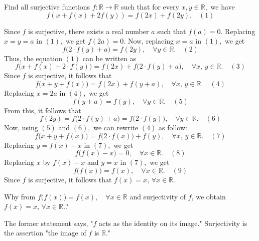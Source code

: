 \begin{solution}
	\begin{tcolorbox}Find all surjective functions $f: \mathbb R \to \mathbb R$ such that for every $x,y\in \mathbb R,$ we have
\[f(x+f(x)+2f(y))=f(2x)+f(2y).\quad (1) \]\end{tcolorbox}
Since $f $ is surjective, there exists a real number $a$ such that $f(a)=0.$ Replacing $x=y=a$ in $(1),$ we get $f(2a)=0.$ Now, replacing $x=a$ in $(1),$ we get \[f\big(2\cdot f(y)+a\big)=f(2y),\quad \forall y \in \mathbb R.\quad (2)\] Thus, the equation $(1)$ can be written as \[f\big( x+f(x)+2\cdot f(y)\big)=f(2x)+f\big(2\cdot f(y)+a\big),\quad \forall x ,\, y \in \mathbb R.\quad (3)\] Since $f$ is surjective, it follows that \[f\big(x+y+f(x)\big)=f(2x)+f(y+a),\quad \forall x,\,y \in \mathbb R.\quad (4)\] Replacing $x=2a$ in $(4),$ we get \[f(y+a)=f(y),\quad \forall y \in \mathbb R.\quad (5)\] From this, it follows that \[f(2y)=f\big(2\cdot f(y)+a\big)=f\big(2\cdot f(y)\big),\quad \forall y \in \mathbb R.\quad (6)\] Now, using $(5)$ and $(6),$ we can rewrite $(4)$ as follow: \[f\big(x+y+f(x)\big)=f\big(2\cdot f(x)\big)+f(y),\quad \forall x ,\,y \in \mathbb R.\quad (7)\] Replacing $y=f(x)-x$ in $(7),$ we get \[f\big(f(x)-x\big)=0,\quad \forall x \in \mathbb R.\quad (8)\] Replacing $x$ by $f(x)-x$ and $y=x$ in $(7),$ we get \[f\big(f(x)\big)=f(x),\quad \forall x \in \mathbb R.\quad (9)\] Since $f$ is surjective, it follows that $f(x)=x,\, \forall x \in \mathbb R.$
\end{solution}



\begin{solution}
	Why from $f\big(f(x)\big)=f(x),\quad\forall x\in\mathbb{R}$ and surjectivity of $f$, we obtain $ f(x)=x,\,\forall x\in\mathbb{R}. $?
\end{solution}



\begin{solution}
	The former statement says, "$f$ acts as the identity on its image."  Surjectivity is the assertion "the image of $f$ is $\mathbb{R}$."
\end{solution}



